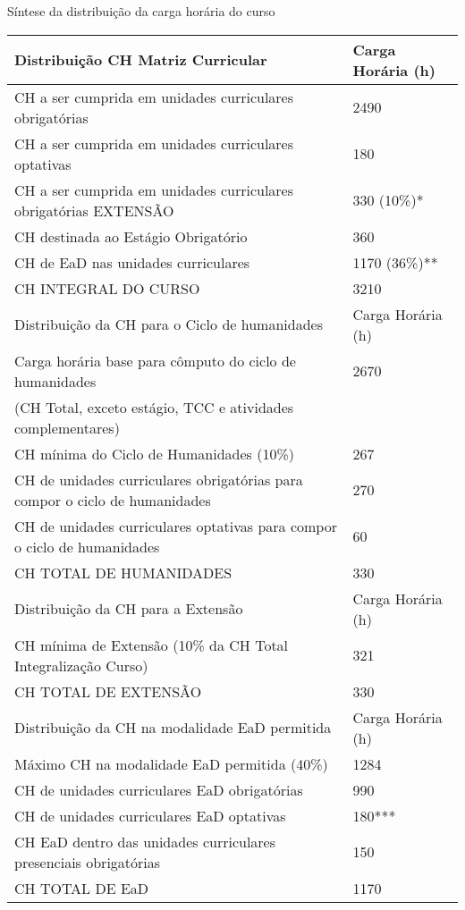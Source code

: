 \begin{quadro}[ht!]
\centering
\caption{Síntese da distribuição da carga horária do curso}

\small
\begin{tabular}{| l | l |}
\hline
\rowcolor{blue1}
Distribuição CH Matriz Curricular & Carga Horária (h)  \\
\hline
CH a ser  cumprida em unidades curriculares obrigatórias & 2490\\ \hline
CH a ser  cumprida em unidades curriculares optativas & 180\\ \hline
CH a ser cumprida em unidades curriculares obrigatórias EXTENSÃO & 330 (10\%)* \\\hline
CH destinada ao Estágio Obrigatório & 360 \\ \hline
CH de EaD nas unidades curriculares & 1170 (36\%)** \\ \hline
CH  INTEGRAL DO CURSO & 3210\\ \hline
\rowcolor{blue1}
Distribuição da CH para o Ciclo de humanidades & Carga Horária (h)  \\
\hline
Carga horária base para cômputo do ciclo de humanidades & 2670\\
(CH Total, exceto estágio, TCC e atividades complementares) & \\ \hline
CH mínima do Ciclo de Humanidades (10\%) & 267 \\ \hline
CH de unidades curriculares obrigatórias para compor o ciclo de humanidades & 270 \\ \hline
CH de unidades curriculares optativas para compor o ciclo de humanidades & 60 \\ \hline
CH TOTAL DE HUMANIDADES & 330\\ \hline
\rowcolor{blue1}
Distribuição da CH para a Extensão & Carga Horária (h)  \\
\hline
CH mínima de Extensão (10\% da CH Total Integralização Curso) & 321\\ \hline
CH TOTAL DE EXTENSÃO & 330 \\ \hline
\rowcolor{blue1}
Distribuição da CH na modalidade EaD permitida & Carga Horária (h)  \\
\hline
Máximo CH na modalidade EaD permitida (40\%) & 1284\\ \hline
CH de unidades curriculares EaD obrigatórias & 990 \\ \hline
CH de unidades curriculares EaD optativas & 180***\\ \hline
CH EaD dentro das unidades curriculares presenciais obrigatórias & 150\\ \hline
CH TOTAL DE EaD & 1170\\ \hline


\end{tabular}
\end{quadro}
